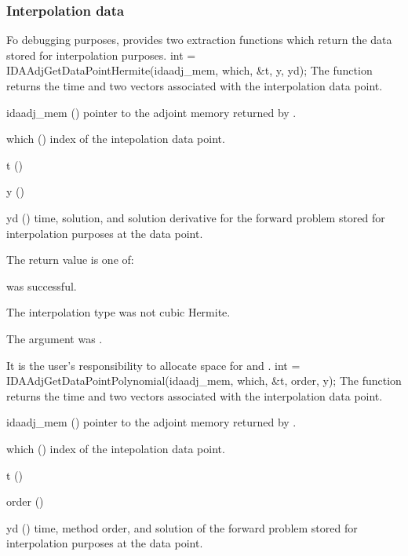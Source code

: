 \subsubsection{Interpolation data}
Fo debugging purposes, {\idaa} provides two extraction functions which 
return the data stored for interpolation purposes.
{
  int = IDAAdjGetDataPointHermite(idaadj\_mem, which, \&t, y, yd);
}
{
  The function  returns the
  time and two vectors associated with the  interpolation data point.
}
{
  \begin{args}
  \item[idaadj\_mem] ()
    pointer to the adjoint memory returned by .
  \item[which] ()
    index of the intepolation data point.
  \item[t] ()
  \item[y] ()
  \item[yd] ()
    time, solution, and solution derivative for the forward problem 
    stored for interpolation purposes at the  data point.
  \end{args}
}
{
  The return value  is one of:
  \begin{args}
  \item[\Id{IDA\_SUCCESS}] 
     was successful.
  \item[\Id{IDA\_ILL\_INPUT}]
    The interpolation type was not cubic Hermite.
  \item[\Id{IDA\_ADJMEM\_NULL}]
    The  argument was .
  \end{args}
}
{
  It is the user's responsibility to allocate space for  and .
}
{
  int = IDAAdjGetDataPointPolynomial(idaadj\_mem, which, \&t, order, y);
}
{
  The function  returns the
  time and two vectors associated with the  interpolation data point.
}
{
  \begin{args}
  \item[idaadj\_mem] ()
    pointer to the adjoint memory returned by .
  \item[which] ()
    index of the intepolation data point.
  \item[t] ()
  \item[order] ()
  \item[yd] ()
    time, method order, and solution of the forward problem 
    stored for interpolation purposes at the  data point.
  \end{args}
}

